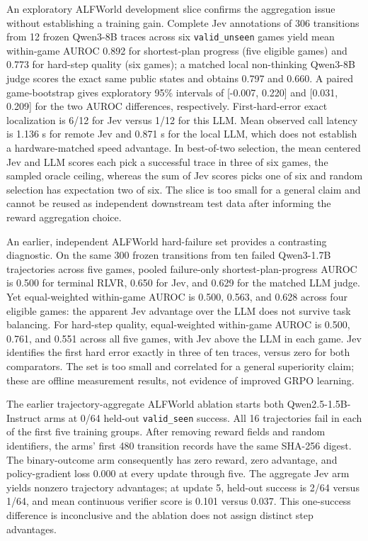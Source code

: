 \documentclass{article}
\begin{document}
An exploratory ALFWorld development slice confirms the aggregation issue without establishing a training gain. Complete Jev annotations of 306 transitions from 12 frozen Qwen3-8B traces across six \texttt{valid\_unseen} games yield mean within-game AUROC 0.892 for shortest-plan progress (five eligible games) and 0.773 for hard-step quality (six games); a matched local non-thinking Qwen3-8B judge scores the exact same public states and obtains 0.797 and 0.660. A paired game-bootstrap gives exploratory 95\% intervals of [-0.007, 0.220] and [0.031, 0.209] for the two AUROC differences, respectively. First-hard-error exact localization is 6/12 for Jev versus 1/12 for this LLM. Mean observed call latency is 1.136 s for remote Jev and 0.871 s for the local LLM, which does not establish a hardware-matched speed advantage. In best-of-two selection, the mean centered Jev and LLM scores each pick a successful trace in three of six games, the sampled oracle ceiling, whereas the sum of Jev scores picks one of six and random selection has expectation two of six. The slice is too small for a general claim and cannot be reused as independent downstream test data after informing the reward aggregation choice.

An earlier, independent ALFWorld hard-failure set provides a contrasting diagnostic. On the same 300 frozen transitions from ten failed Qwen3-1.7B trajectories across five games, pooled failure-only shortest-plan-progress AUROC is 0.500 for terminal RLVR, 0.650 for Jev, and 0.629 for the matched LLM judge. Yet equal-weighted within-game AUROC is 0.500, 0.563, and 0.628 across four eligible games: the apparent Jev advantage over the LLM does not survive task balancing. For hard-step quality, equal-weighted within-game AUROC is 0.500, 0.761, and 0.551 across all five games, with Jev above the LLM in each game. Jev identifies the first hard error exactly in three of ten traces, versus zero for both comparators. The set is too small and correlated for a general superiority claim; these are offline measurement results, not evidence of improved GRPO learning.

The earlier trajectory-aggregate ALFWorld ablation starts both Qwen2.5-1.5B-Instruct arms at 0/64 held-out \texttt{valid\_seen} success. All 16 trajectories fail in each of the first five training groups. After removing reward fields and random identifiers, the arms' first 480 transition records have the same SHA-256 digest. The binary-outcome arm consequently has zero reward, zero advantage, and policy-gradient loss 0.000 at every update through five. The aggregate Jev arm yields nonzero trajectory advantages; at update 5, held-out success is 2/64 versus 1/64, and mean continuous verifier score is 0.101 versus 0.037. This one-success difference is inconclusive and the ablation does not assign distinct step advantages.
\end{document}
